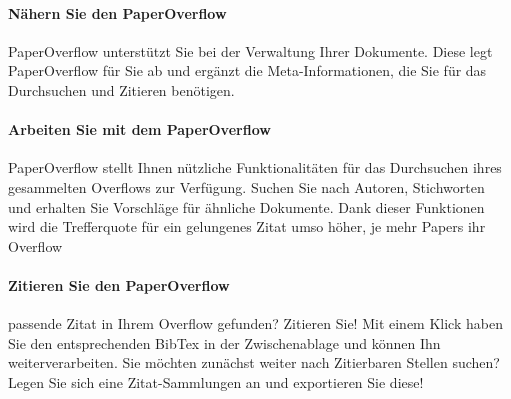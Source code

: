 \documentclass[a4paper,12pt]{article}
\begin{document}
\paragraph{Nähern Sie den PaperOverflow}
PaperOverflow unterstützt Sie bei der Verwaltung Ihrer Dokumente. Diese legt PaperOverflow für Sie ab und ergänzt die Meta-Informationen, die Sie für das Durchsuchen und Zitieren benötigen.

\paragraph{Arbeiten Sie mit dem PaperOverflow}
PaperOverflow stellt Ihnen nützliche Funktionalitäten für das Durchsuchen ihres gesammelten Overflows zur Verfügung. Suchen Sie nach Autoren, Stichworten und erhalten Sie Vorschläge für ähnliche Dokumente. Dank dieser Funktionen wird die Trefferquote für ein gelungenes Zitat umso höher, je mehr Papers ihr Overflow 

\paragraph{Zitieren Sie den PaperOverflow}
passende Zitat in Ihrem Overflow gefunden? Zitieren Sie! Mit einem Klick haben Sie den entsprechenden BibTex in der Zwischenablage und können Ihn weiterverarbeiten. Sie möchten zunächst weiter nach Zitierbaren Stellen suchen? Legen Sie sich eine Zitat-Sammlungen an und exportieren Sie diese!

\end{document}

